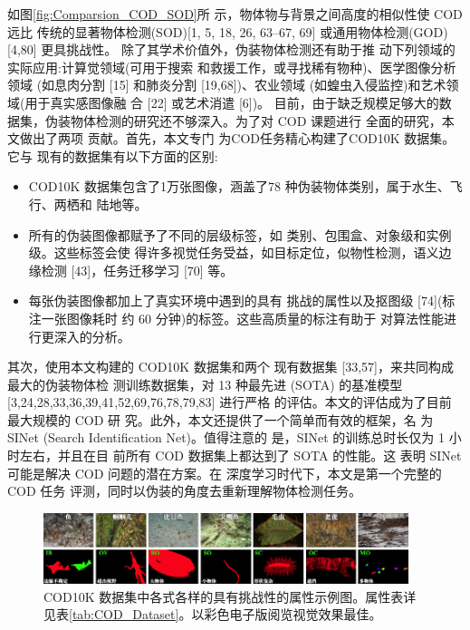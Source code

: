 \documentclass[final]{cvpr}
\renewcommand{\figref}[1]{图\ref{#1}}
\renewcommand{\tabref}[1]{表\ref{#1}}
\begin{document}
如\figref{fig:Comparsion_COD_SOD}所 示，物体物与背景之间高度的相似性使 COD 远比 传统的显著物体检测(SOD)[1, 5, 18, 26, 63–67, 69] 或通用物体检测(GOD)[4,80] 更具挑战性。
除了其学术价值外，伪装物体检测还有助于推 动下列领域的实际应用:计算觉领域(可用于搜索 和救援工作，或寻找稀有物种)、医学图像分析领域
(如息肉分割 [15] 和肺炎分割 [19,68])、农业领域 (如蝗虫入侵监控)和艺术领域(用于真实感图像融
合 [22] 或艺术消遣 [6])。
目前，由于缺乏规模足够大的数据集，伪装物体检测的研究还不够深入。为了对 COD 课题进行
全面的研究，本文做出了两项
贡献。首先，本文专门 为COD任务精心构建了COD10K 数据集。它与 现有的数据集有以下方面的区别:
\begin{itemize}
    \item COD10K 数据集包含了1万张图像，涵盖了78 种伪装物体类别，属于水生、飞行、两栖和 陆地等。
    \item 所有的伪装图像都赋予了不同的层级标签，如 类别、包围盒、对象级和实例级。这些标签会使 得许多视觉任务受益，如目标定位，似物性检测，语义边缘检测 [43]，任务迁移学习 [70] 等。
    \item 每张伪装图像都加上了真实环境中遇到的具有 挑战的属性以及抠图级 [74](标注一张图像耗时 约 60 分钟)的标签。这些高质量的标注有助于 对算法性能进行更深入的分析。
\end{itemize}%


其次，使用本文构建的 COD10K 数据集和两个 现有数据集 [33,57]，来共同构成最大的伪装物体检 测训练数据集，对 13 种最先进 (SOTA) 的基准模型 [3,24,28,33,36,39,41,52,69,76,78,79,83] 进行严格 的评估。本文的评估成为了目前最大规模的 COD 研 究。此外，本文还提供了一个简单而有效的框架，名 为 SINet (Search Identification Net)。值得注意的 是，SINet 的训练总时长仅为 1 小时左右，并且在目 前所有 COD 数据集上都达到了 SOTA 的性能。这 表明 SINet 可能是解决 COD 问题的潜在方案。在 深度学习时代下，本文是第一个完整的 COD 任务 评测，同时以伪装的角度去重新理解物体检测任务。





\begin{figure}[tp]
    \centering
    \includegraphics[width=0.95\textwidth]{COD_Zh_translate/figures/COD10K_features.png}
    \caption{COD10K 数据集中各式各样的具有挑战性的属性示例图。属性表详见\tabref{tab:COD_Dataset}。以彩色电子版阅览视觉效果最佳。}
    \label{fig:COD10K_features}
\end{figure}
\end{document}
